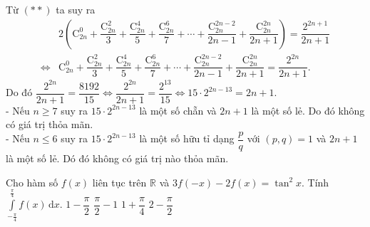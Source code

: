 \begin{ex}
{Từ $(**)$ ta suy ra 
	\begin{align*}
{ }&2\left(\mathrm{C}^{0}_{2n} + \dfrac{\mathrm{C}^{2}_{2n}}{3} + \dfrac{\mathrm{C}^{4}_{2n}}{5} + \dfrac{\mathrm{C}^{6}_{2n}}{7} + \cdots + \dfrac{\mathrm{C}^{2n - 2}_{2n}}{2n - 1} + \dfrac{\mathrm{C}^{2n}_{2n}}{2n + 1}\right) = \dfrac{2^{2n + 1}}{2n + 1}\\
\Leftrightarrow &\mathrm{C}^{0}_{2n} + \dfrac{\mathrm{C}^{2}_{2n}}{3} + \dfrac{\mathrm{C}^{4}_{2n}}{5} + \dfrac{\mathrm{C}^{6}_{2n}}{7} + \cdots + \dfrac{\mathrm{C}^{2n - 2}_{2n}}{2n - 1} + \dfrac{\mathrm{C}^{2n}_{2n}}{2n + 1} = \dfrac{2^{2n}}{2n + 1}.
\end{align*}
Do đó $\dfrac{2^{2n}}{2n + 1} = \dfrac{8192}{15}\Leftrightarrow \dfrac{2^{2n}}{2n + 1} = \dfrac{2^{13}}{15}\Leftrightarrow 15\cdot 2^{2n - 13} = 2n + 1$.\\
- Nếu $n \geq  7$ suy ra  $15\cdot 2^{2n - 13}$ là một số chẵn và $2n  + 1$ là một số lẻ. Do đó không có giá trị thỏa mãn.\\
- Nếu $n\leq 6$ suy ra  $15\cdot 2^{2n - 13}$ là một số hữu tỉ dạng $\dfrac{p}{q}$ với $\left(p, q\right) = 1$ và $2n  + 1$ là một số lẻ. Dó đó không có giá trị nào thỏa mãn.\\
}
\end{ex}


\begin{ex}%
Cho hàm số $f\left(x\right)$ liên tục trên $\mathbb{R}$ và $3f\left(- x\right) - 2f\left(x\right) = \tan^2x$. Tính $\displaystyle\int\limits_{- \tfrac{\pi}{4}}^{\tfrac{\pi}{4}}f\left(x\right)\, \mathrm{d}x$.
	\choice
	{$1 - \dfrac{\pi}{2}$}
	{$\dfrac{\pi}{2} - 1$}
	{$1 + \dfrac{\pi}{4}$}
	{\True $2 - \dfrac{\pi}{2}$}
\end{ex}

